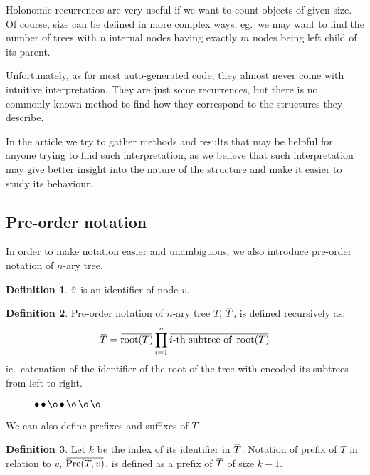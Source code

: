 \documentclass[final]{article}
\theoremstyle{definition}
\newtheorem{definition}{Definition}[subsection]
\theoremstyle{remark}
\newcommand{\ols}[1]{\mskip.5\thinmuskip\overline{\mskip-.5\thinmuskip {#1} \mskip-.5\thinmuskip}\mskip.5\thinmuskip} %
\newcommand{\enc}[1]{\ensuremath{\ols{#1}}}
\DeclareMathOperator{\troot}{\text{root}}
\DeclareMathOperator{\tPre}{\text{Pre}}
\DeclareMathOperator{\n}{\bullet}
\DeclareMathOperator{\no}{\o}
\begin{document}
Holonomic recurrences are very useful if we want to count objects of given size. Of course, size can be defined in more complex ways, eg.\ we may want to find the number of trees with \(n\) internal nodes having exactly \(m\) nodes being left child of its parent.

Unfortunately, as for most auto-generated code, they almost never come with intuitive interpretation. They are just some recurrences, but there is no commonly known method to find how they correspond to the structures they describe.

In the article we try to gather methods and results that may be helpful for anyone trying to find such interpretation, as we believe that such interpretation may give better insight into the nature of the structure and make it easier to study its behaviour.

\subsection{Pre-order notation}%
\label{sub:pre_order_notation}



In order to make notation easier and unambiguous, we also introduce pre-order notation of \(n\)-ary tree.

\begin{definition}
    \(\enc{v}\) is an identifier of node \(v\). 
\end{definition}

\begin{definition}
    Pre-order notation of \(n\)-ary tree \(T\), \(\enc{T}\), is defined recursively as:
    \[\enc{T} = \enc{\troot(T)} \prod_{i=1}^{n} \enc{i\text{-th subtree of } \troot(T)}\]
    ie.\ catenation of the identifier of the root of the tree with encoded its subtrees from left to right.
\end{definition}

\begin{figure}[h]
    \centering
    
    \caption{\(\n \n \no \n \no \no \no\)}
    \label{fig:oononnn}
\end{figure}

We can also define prefixes and suffixes of \(T\).

\begin{definition}
    Let \(k\) be the index of its identifier in \enc{T}. Notation of prefix of \(T\) in relation to \(v\), \(\enc{\tPre(T, v)}\), is defined as a prefix of \enc{T} of size \(k - 1\).
\end{definition}
\end{document}

